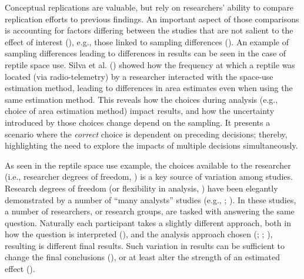\documentclass[10pt,a4paper]{article}
\begin{document}
Conceptual replications are valuable, but rely on researchers' ability to compare replication efforts to previous findings.
An important aspect of those comparisons is accounting for factors differing between the studies that are not salient to the effect of interest (), e.g., those linked to sampling differences ().
An example of sampling differences leading to differences in results can be seen in the case of reptile space use.
Silva et al. () showed how the frequency at which a reptile was located (via radio-telemetry) by a researcher interacted with the space-use estimation method, leading to differences in area estimates even when using the same estimation method.
This reveals how the choices during analysis (e.g., choice of area estimation method) impact results, and how the uncertainty introduced by those choices change depend on the sampling.
It presents a scenario where the \emph{correct} choice is dependent on preceding decisions; thereby, highlighting the need to explore the impacts of multiple decisions simultaneously.

As seen in the reptile space use example, the choices available to the researcher (i.e., researcher degrees of freedom, ) is a key source of variation among studies.
Research degrees of freedom (or flexibility in analysis, ) have been elegantly demonstrated by a number of ``many analysts'' studies (e.g., ; ).
In these studies, a number of researchers, or research groups, are tasked with answering the same question.
Naturally each participant takes a slightly different approach, both in how the question is interpreted (), and the analysis approach chosen (; ; ), resulting is different final results.
Such variation in results can be sufficient to change the final conclusions (), or at least alter the strength of an estimated effect ().
\end{document}
